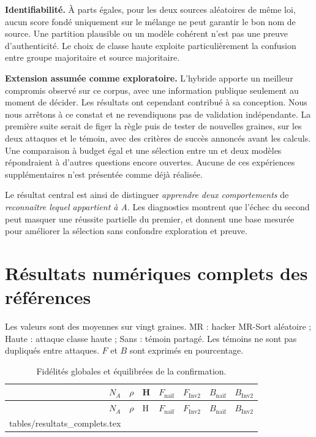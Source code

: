 \documentclass[11pt,a4paper]{article}
\makeatletter
\let\tableinput\@@input
\makeatother
\begin{document}
\textbf{Identifiabilité.} À parts égales, pour les deux sources aléatoires de
même loi, aucun score fondé uniquement sur le mélange ne peut garantir le bon
nom de source. Une partition plausible ou un modèle cohérent n'est pas une
preuve d'authenticité. Le choix de classe haute exploite particulièrement la
confusion entre groupe majoritaire et source majoritaire.

\textbf{Extension assumée comme exploratoire.} L'hybride apporte un meilleur
compromis observé sur ce corpus, avec une information publique seulement au
moment de décider. Les résultats ont cependant contribué à sa conception.
Nous nous arrêtons à ce constat et ne revendiquons pas de validation indépendante.
La première suite serait de figer la règle puis de tester de nouvelles graines,
sur les deux attaques et le témoin, avec des critères de succès annoncés avant
les calculs. Une comparaison à budget égal et une sélection entre un et deux
modèles répondraient à d'autres questions encore ouvertes. Aucune de ces
expériences supplémentaires n'est présentée comme déjà réalisée.

Le résultat central est ainsi de distinguer \emph{apprendre deux comportements}
de \emph{reconnaître lequel appartient à A}. Les diagnostics montrent que
l'échec du second peut masquer une réussite partielle du premier, et donnent
une base mesurée pour améliorer la sélection sans confondre exploration et preuve.

\clearpage
\appendix
\section{Résultats numériques complets des références}
Les valeurs sont des moyennes sur vingt graines. MR : hacker MR-Sort aléatoire ;
Haute : attaque classe haute ; Sans : témoin partagé. Les témoins ne sont pas
dupliqués entre attaques. $F$ et $B$ sont exprimés en pourcentage.

\begin{center}\small
\begin{longtable}{rrlrrrr}
\caption{Fidélités globales et équilibrées de la confirmation.}\label{tab:complets}\\
\toprule
$N_A$ & $\rho$ & H & $F_{\text{naïf}}$ & $F_{\mathrm{Inv2}}$ & $B_{\text{naïf}}$ & $B_{\mathrm{Inv2}}$ \\
\midrule\endfirsthead
\toprule $N_A$ & $\rho$ & H & $F_{\text{naïf}}$ & $F_{\mathrm{Inv2}}$ & $B_{\text{naïf}}$ & $B_{\mathrm{Inv2}}$ \\
\midrule\endhead
\tableinput tables/resultats_complets.tex
\bottomrule
\end{longtable}
\end{center}
\end{document}
